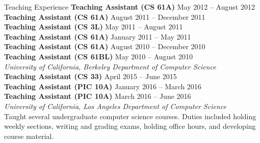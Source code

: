 \documentclass{resume}
\begin{document}
\begin{component}{Teaching Experience}
    \textbf{Teaching Assistant (CS 61A)} \hfill May 2012 -- August 2012 \\
    \textbf{Teaching Assistant (CS 61A)} \hfill August 2011 -- December 2011 \\
    \textbf{Teaching Assistant (CS 3L)} \hfill May 2011 -- August 2011 \\
    \textbf{Teaching Assistant (CS 61A)} \hfill January 2011 -- May 2011 \\
    \textbf{Teaching Assistant (CS 61A)} \hfill August 2010 -- December 2010 \\
    \textbf{Teaching Assistant (CS 61BL)} \hfill May 2010 -- August 2010 \\
        \textit{University of California, Berkeley \hfill Department of Computer Science}\\
    \textbf{Teaching Assistant (CS 33)} \hfill April 2015 -- June 2015 \\
    \textbf{Teaching Assistant (PIC 10A)} \hfill January 2016 -- March 2016 \\
    \textbf{Teaching Assistant (PIC 10A)} \hfill March 2016 -- June 2016 \\
        \textit{University of California, Los Angeles \hfill Department of Computer Science}\\
    Taught several undergraduate computer science courses. Duties included holding weekly sections, writing and grading exams, holding office hours, and developing course material.
\end{component}

\vspace{0.5em}
\end{document}

